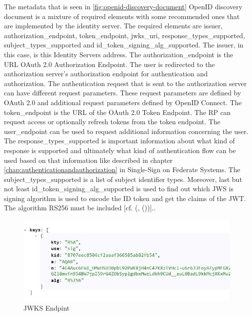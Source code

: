The metadata that is seen in \ref{fig:openid-discovery-document} OpenID discovery document is a mixture of required elements with some recommended ones that are implemented by the identity server. The required elements are issuer, authorization\_endpoint, token\_endpoint, jwks\_uri, response\_types\_supported, subject\_types\_supported and id\_token\_signing\_alg\_supported. The issuer, in this case, is this Identity Servers address. The authorization\_endpoint is the URL OAuth 2.0 Authorization Endpoint. The user is redirected to the authorization server's authorization endpoint for authentication and authorization. The authentication request that is sent to the authorization server can have different request parameters. These request parameters are defined by OAuth 2.0 and additional request parameters defined by OpenID Connect. The token\_endpoint is the URL of the OAuth 2.0 Token Endpoint. The RP can request access or optionally refresh tokens from the token endpoint. The user\_endpoint can be used to request additional information concerning the user. The response\_types\_supported is important information about what kind of response is supported and ultimately what kind of authentication flow can be used based on that information like described in chapter \ref{chap:authenticationandauthorization} in Single-Sign on Federate Systems. The subject\_types\_supported is a list of subject identifier types. Moreover, last but not least id\_token\_signing\_alg\_supported is used to find out which JWS is signing algorithm is used to encode the ID token and get the claims of the JWT. The algorithm RS256 must be included [cf. (\cite{Sakimura:OIDCC}, (\cite{Sakimura:OIDCD}))].. 

\begin{figure}[h]
	\centering
	\includegraphics[width=0.7\linewidth]{images/jwkDiscovoryDocument}
	\caption{JWKS Endpint}
	\label{fig:jwkdiscovorydocument}
\end{figure}

